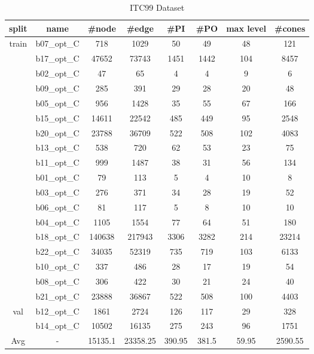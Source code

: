 \begin{table}[H]
\caption{ITC99 Dataset}
\centering
\begin{tabular}{@{}c|ccccccc@{}}
\toprule
split & name & \#node & \#edge & \#PI & \#PO & max level & \#cones \\ \midrule
\multirow{18}{*}{train} & b07\_opt\_C & 718 & 1029 & 50 & 49 & 48 & 121 \\
 & b17\_opt\_C & 47652 & 73743 & 1451 & 1442 & 104 & 8457 \\
 & b02\_opt\_C & 47 & 65 & 4 & 4 & 9 & 6 \\
 & b09\_opt\_C & 285 & 391 & 29 & 28 & 20 & 48 \\
 & b05\_opt\_C & 956 & 1428 & 35 & 55 & 67 & 166 \\
 & b15\_opt\_C & 14611 & 22542 & 485 & 449 & 95 & 2548 \\
 & b20\_opt\_C & 23788 & 36709 & 522 & 508 & 102 & 4083 \\
 & b13\_opt\_C & 538 & 720 & 62 & 53 & 23 & 75 \\
 & b11\_opt\_C & 999 & 1487 & 38 & 31 & 56 & 134 \\
 & b01\_opt\_C & 79 & 113 & 5 & 4 & 10 & 8 \\
 & b03\_opt\_C & 276 & 371 & 34 & 28 & 19 & 52 \\
 & b06\_opt\_C & 81 & 117 & 5 & 8 & 10 & 10 \\
 & b04\_opt\_C & 1105 & 1554 & 77 & 64 & 51 & 180 \\
 & b18\_opt\_C & 140638 & 217943 & 3306 & 3282 & 214 & 23214 \\
 & b22\_opt\_C & 34035 & 52319 & 735 & 719 & 103 & 6133 \\
 & b10\_opt\_C & 337 & 486 & 28 & 17 & 19 & 54 \\
 & b08\_opt\_C & 306 & 422 & 30 & 21 & 24 & 40 \\
 & b21\_opt\_C & 23888 & 36867 & 522 & 508 & 100 & 4403 \\ \midrule
\multirow{2}{*}{val} & b12\_opt\_C & 1861 & 2724 & 126 & 117 & 29 & 328 \\
 & b14\_opt\_C & 10502 & 16135 & 275 & 243 & 96 & 1751 \\ \midrule
Avg & - & 15135.1 & 23358.25 & 390.95 & 381.5 & 59.95 & 2590.55 \\ \bottomrule
\end{tabular}
\label{itc_data}
\end{table}






